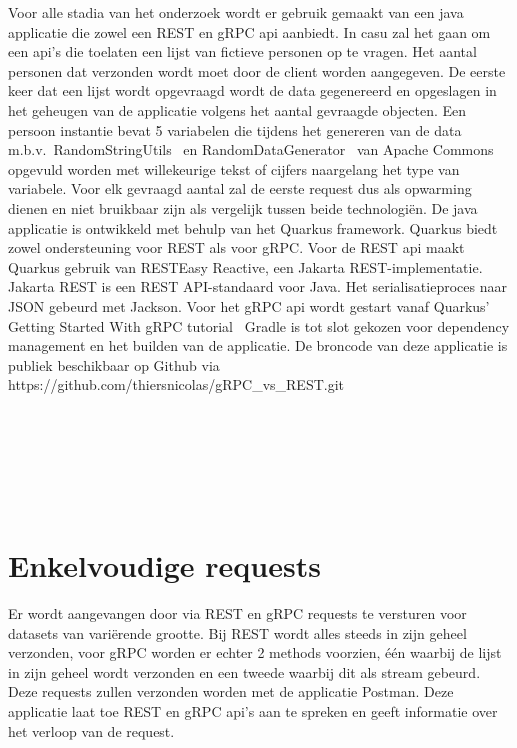 Voor alle stadia van het onderzoek wordt er gebruik gemaakt van een java applicatie die zowel een REST en gRPC api aanbiedt.
In casu zal het gaan om een api's die toelaten een lijst van fictieve personen op te vragen. Het aantal personen dat verzonden wordt moet door de client worden aangegeven.
De eerste keer dat een lijst wordt opgevraagd wordt de data gegenereerd en opgeslagen in het geheugen van de applicatie volgens het aantal gevraagde objecten.
Een persoon instantie bevat 5 variabelen die tijdens het genereren van de data m.b.v.\ RandomStringUtils~\parencite{RandomStringUtils}
en RandomDataGenerator~\parencite{RandomDataGenerator} van Apache Commons opgevuld worden met willekeurige tekst of cijfers naargelang het type van variabele.
Voor elk gevraagd aantal zal de eerste request dus als opwarming dienen en niet bruikbaar zijn als vergelijk tussen beide technologiën.
De java applicatie is ontwikkeld met behulp van het Quarkus framework.
Quarkus biedt zowel ondersteuning voor REST als voor gRPC.
Voor de REST api maakt Quarkus gebruik van RESTEasy Reactive, een Jakarta REST-implementatie.
Jakarta REST is een REST API-standaard voor Java.
Het serialisatieproces naar JSON gebeurd met Jackson.
Voor het gRPC api wordt gestart vanaf Quarkus' Getting Started With gRPC tutorial~\parencite{quarkusgRPC}
Gradle is tot slot gekozen voor dependency management en het builden van de applicatie.\newline
\newline
De broncode van deze applicatie is publiek beschikbaar op Github via https://github.com/thiersnicolas/gRPC\_vs\_REST.git



~\autocite{quarkusAbout}\\
~\autocite{quarkusREST}\\
~\autocite{Jakarta}\\
~\autocite{quarkusgRPC}\\
~\autocite{Gradle}\\

\section{Enkelvoudige requests}

Er wordt aangevangen door via REST en gRPC requests te versturen voor datasets van variërende grootte.
Bij REST wordt alles steeds in zijn geheel verzonden,
voor gRPC worden er echter 2 methods voorzien, één waarbij de lijst in zijn geheel wordt verzonden en een tweede waarbij dit als stream gebeurd.
Deze requests zullen verzonden worden met de applicatie Postman.
Deze applicatie laat toe REST en gRPC api's aan te spreken en geeft informatie over het verloop van de request.

